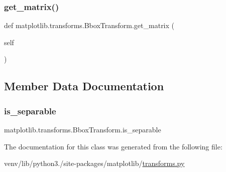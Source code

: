 \subsubsection{\texorpdfstring{get\+\_\+matrix()}{get\_matrix()}}
{\footnotesize\ttfamily def matplotlib.\+transforms.\+Bbox\+Transform.\+get\+\_\+matrix (\begin{DoxyParamCaption}\item[{}]{self }\end{DoxyParamCaption})}



\subsection{Member Data Documentation}
\mbox{\label{classmatplotlib_1_1transforms_1_1BboxTransform_a0dc283b09909206424ef639421d14203}} 
\subsubsection{\texorpdfstring{is\+\_\+separable}{is\_separable}}
{\footnotesize\ttfamily matplotlib.\+transforms.\+Bbox\+Transform.\+is\+\_\+separable\hspace{0.3cm}{\ttfamily [static]}}



The documentation for this class was generated from the following file\+:\begin{DoxyCompactItemize}
\item 
venv/lib/python3./site-\/packages/matplotlib/\hyperlink{transforms_8py}{transforms.\+py}\end{DoxyCompactItemize}
